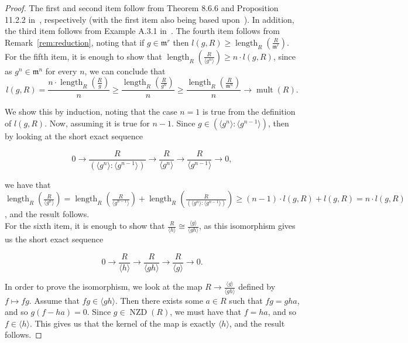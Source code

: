 \documentclass{article}
\DeclareMathOperator{\length}{length}
\DeclareMathOperator{\NZD}{NZD}
\DeclareMathOperator{\mult}{mult}
\numberwithin{theorem}{section}
\begin{document}
\begin{proof}
The first and second item follow from Theorem 8.6.6 and Proposition 11.2.2 in~\cite{huneke2006integral}, respectively (with the first item also being based upon~\cite{northcott1954reductions, trung2003constructive}). In addition, the third item follows from Example A.3.1 in~\cite{fulton2013intersection}. The fourth item follows from Remark~\ref{rem:reduction}, noting that if $g \in \mathfrak{m}^r$ then $l(g,R) \geq \length_R\left(\frac{R}{\mathfrak{m}^r}\right)$.  \\

For the fifth item, it is enough to show that $\length_R\left(\frac{R}{\langle g^n \rangle }\right) \geq n\cdot l(g,R)$, since as $g^n \in \mathfrak{m}^n$ for every $n$, we can conclude that 
\begin{equation*}
    l(g,R) = \frac{n \cdot \length_R\left(\frac{R}{g}\right)}{n} \geq \frac{\length_R\left(\frac{R}{g^n}\right)}{n} \geq   \frac{\length_R\left(\frac{R}{\mathfrak{m}^n}\right)}{n} \to \mult(R). 
\end{equation*}

\noindent We show this by induction, noting that the case $n=1$ is true from the definition of $l(g,R)$. Now, assuming it is true for $n-1$. Since $g \in (\langle g^n \rangle \colon \langle g^{n-1}\rangle)$, then by looking at the short exact sequence 

\begin{equation*}
    0 \to \frac{R}{(\langle g^n \rangle \colon \langle g^{n-1}\rangle)} \to \frac{R}{\langle g^n\rangle} \to \frac{R}{\langle g^{n-1}\rangle} \to 0,
\end{equation*}

\noindent we have that $\length_R\left(\frac{R}{\langle g^n\rangle}\right) = \length_R\left(\frac{R}{\langle g^{n-1}\rangle}\right) +\length_R\left(\frac{R}{(\langle g^n \rangle \colon \langle g^{n-1}\rangle)}\right)  \geq (n-1) \cdot l(g,R) + l(g,R) = n\cdot l(g,R)$, and the result follows. \\

For the sixth item, it is enough to show that $\frac{R}{\langle h \rangle} \cong \frac{\langle g \rangle}{\langle gh \rangle}$, as this isomorphism gives us the short exact sequence 

\begin{equation*}
    0 \to \frac{R}{\langle h \rangle} \to \frac{R}{\langle gh \rangle} \to \frac{R}{\langle g \rangle} \to 0.
\end{equation*}

\noindent In order to prove the isomorphism, we look at the map $R \to \frac{\langle g \rangle}{\langle gh \rangle}$ defined by $f \mapsto fg$. Assume that $fg \in \langle gh \rangle$. Then there exists some $a \in R$ such that $fg = gha$, and so $g(f-ha)=0$. Since $g \in \NZD(R)$, we must have that $f=ha$, and so $f \in \langle h \rangle$. This gives us that the kernel of the map is exactly $\langle h \rangle$, and the result follows. 
\end{proof}
\end{document}
